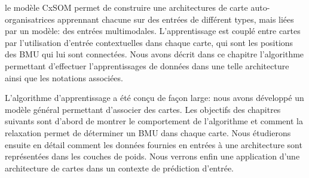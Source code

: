 le modèle CxSOM permet de construire une architectures de carte auto-organisatrices apprennant chacune sur des entrées de différent types, mais liées par un modèle: des entrées multimodales. L'apprentissage est couplé entre cartes par l'utilisation d'entrée contextuelles dans chaque carte, qui sont les positions des BMU qui lui sont connectées. Nous avons décrit dans ce chapitre l'algorithme permettant d'effectuer l'apprentissages de données dans une telle architecture ainsi que les notations associées.

L'algorithme d'apprentissage a été conçu de façon large: nous avons développé un modèle général permettant d'associer des cartes. Les objectifs des chapitres suivants sont d'abord de montrer le comportement de l'algorithme et comment la relaxation permet de déterminer un BMU dans chaque carte. Nous étudierons ensuite en détail comment les données fournies en entrées à une architecture sont représentées dans les couches de poids. Nous verrons enfin une application d'une architecture de cartes dans un contexte de prédiction d'entrée.

